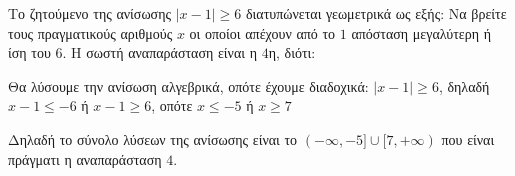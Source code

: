 
\begin{alist}
\item Το ζητούμενο της ανίσωσης $|x - 1| \ge 6$ διατυπώνεται γεωμετρικά ως εξής: Να βρείτε τους πραγματικούς αριθμούς $x$ οι οποίοι απέχουν από το $1$ απόσταση μεγαλύτερη ή ίση του $6$.
Η σωστή αναπαράσταση είναι η $4$η, διότι:
\begin{center}
\end{center}

\item Θα λύσουμε την ανίσωση αλγεβρικά, οπότε έχουμε διαδοχικά:
$|x - 1| \ge 6$, δηλαδή
$x - 1 \le -6$ ή $x - 1 \ge 6$, οπότε
$x \le -5$ ή $x \ge 7$

Δηλαδή το σύνολο λύσεων της ανίσωσης είναι το $(-\infty, -5] \cup [7, +\infty)$ που είναι πράγματι η αναπαράσταση $4$.
\end{alist}

